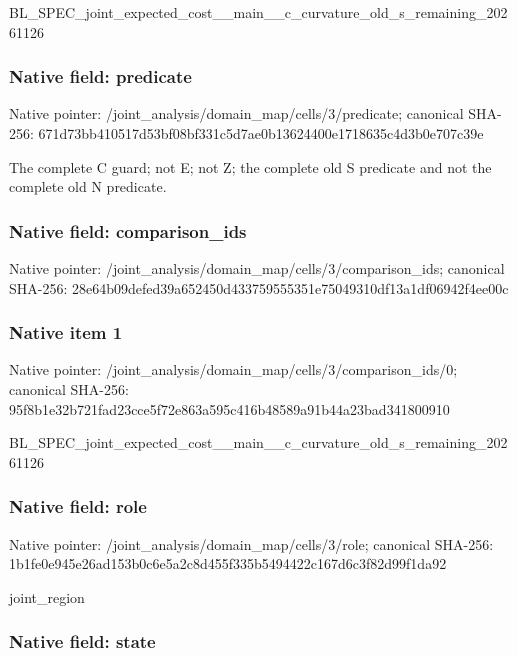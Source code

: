 \documentclass[10pt,a4paper]{article}
\begin{document}
BL\_SPEC\_joint\_expected\_c\allowbreak{}ost\_\_main\_\_c\_curvature\_o\allowbreak{}ld\_s\_remaining\_20261126


\subsubsection{Native field: predicate}


Native pointer: /joint\_analysis/domain\_m\allowbreak{}ap/cells/3/predicate; canonical SHA-256: 671d73bb410517d53bf08bf3\allowbreak{}31c5d7ae0b13624400e17186\allowbreak{}35c4d3b0e707c39e


The complete C guard; not E; not Z; the complete old S predicate and not the complete old N predicate.


\subsubsection{Native field: comparison\_ids}


Native pointer: /joint\_analysis/domain\_m\allowbreak{}ap/cells/3/comparison\_id\allowbreak{}s; canonical SHA-256: 28e64b09defed39a652450d4\allowbreak{}33759555351e75049310df13\allowbreak{}a1df06942f4ee00c



\subsubsection{Native item 1}


Native pointer: /joint\_analysis/domain\_m\allowbreak{}ap/cells/3/comparison\_id\allowbreak{}s/0; canonical SHA-256: 95f8b1e32b721fad23cce5f7\allowbreak{}2e863a595c416b48589a91b4\allowbreak{}4a23bad341800910


BL\_SPEC\_joint\_expected\_c\allowbreak{}ost\_\_main\_\_c\_curvature\_o\allowbreak{}ld\_s\_remaining\_20261126


\subsubsection{Native field: role}


Native pointer: /joint\_analysis/domain\_map/cells/3/role; canonical SHA-256: 1b1fe0e945e26ad153b0c6e5\allowbreak{}a2c8d455f335b5494422c167\allowbreak{}d6c3f82d99f1da92


joint\_region


\subsubsection{Native field: state}
\end{document}
